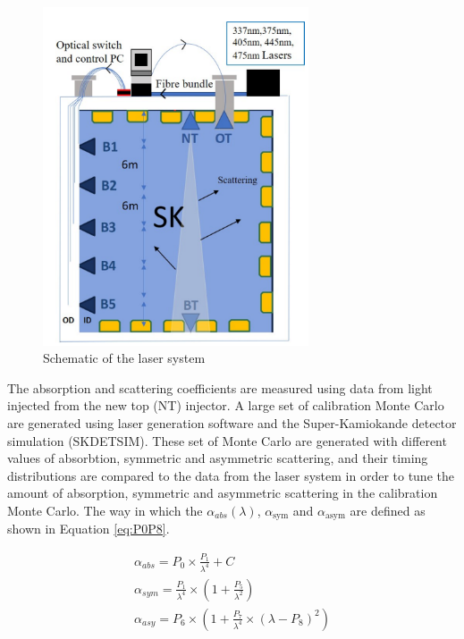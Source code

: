 \begin{figure}
    \centering
    \includegraphics[width=0.7\textwidth]{Figures/laser_system.png}
    \caption{Schematic of the laser system}
    \label{fig:laser_system}
\end{figure}

The absorption and scattering coefficients are measured using data from light injected from the new top (NT) injector. A large set of calibration Monte Carlo are generated using laser generation software and the Super-Kamiokande detector simulation (SKDETSIM). These set of Monte Carlo are generated with different values of absorbtion, symmetric and asymmetric scattering, and their timing distributions are compared to the data from the laser system in order to tune the amount of absorption, symmetric and asymmetric scattering in the calibration Monte Carlo. The way in which the $\alpha_{abs}(\lambda)$, $\alpha_{\text {sym}}$ and $\alpha_{\text {asym}}$ are defined as shown in Equation \ref{eq:P0P8}.

$$
\begin{gathered}
\alpha_{a b s}=P_{0} \times \frac{P_{1}}{\lambda^{4}}+C \label{eq:P0P8}\\ 
\alpha_{s y m}=\frac{P_{1}}{\lambda^{4}} \times\left(1+\frac{P_{5}}{\lambda^{2}}\right) \\
\alpha_{a s y}=P_{6} \times\left(1+\frac{P_{7}}{\lambda^{4}} \times\left(\lambda-P_{8}\right)^{2}\right)
\end{gathered}
$$

